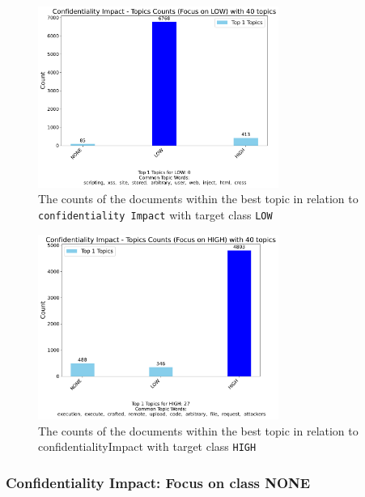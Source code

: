 \documentclass[12pt]{article}
\begin{document}
\begin{figure}[ht]
	\centering
	\includegraphics[width=0.7\textwidth]{figures/confidentialityImpact/merged_top_k_topics_category_focus_counts_confidentialityImpact_LOW_k1.pdf}
	\caption{The counts of the documents within the best topic in relation to \texttt{confidentiality Impact} with target class \texttt{LOW}}
	\label{fig:confidentialityImpact_60_LOW}

\end{figure}

\begin{figure}[ht]
	\centering
	\includegraphics[width=0.7\textwidth]{figures/confidentialityImpact/merged_top_k_topics_category_focus_counts_confidentialityImpact_HIGH_k1.pdf}
	\caption{The counts of the documents within the best topic in relation to confidentialityImpact with target class \texttt{HIGH}}
	\label{fig:confidentialityImpact_60_HIGH}
\end{figure}

\subsubsection{Confidentiality Impact: Focus on class NONE}
\end{document}
